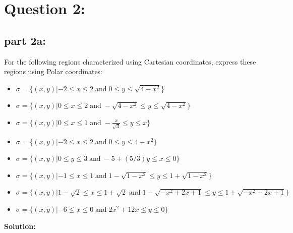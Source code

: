 \documentclass{article}
\newcommand{\dr}[1]{\textcolor{dark_red}{#1}}
\begin{document}
\section*{Question 2:}

\subsection*{part 2a:}

For the following regions characterized using Cartesian coordinates, express these regions using Polar coordinates:

\begin{itemize}
\item \(\sigma = \{(x,y) | -2 \leq x \leq 2 \;\text{and}\; 0 \leq y \leq \sqrt{4 - x^2}\}\)
\item \(\sigma = \{(x,y) | 0 \leq x \leq 2 \;\text{and}\; -\sqrt{4 - x^2} \leq y \leq \sqrt{4 - x^2}\}\)
\item \(\sigma = \{(x,y) | 0 \leq x \leq 1 \;\text{and}\; -\frac{x}{\sqrt{3}} \leq y \leq x\}\)
\item \(\sigma = \{(x,y) | -2 \leq x \leq 2 \;\text{and}\; 0 \leq y \leq 4 - x^2\}\)
\item \(\sigma = \{(x,y) | 0 \leq y \leq 3 \;\text{and}\; -5 + (5/3)y \leq x \leq 0\}\)
\item \(\sigma = \{(x,y) | -1 \leq x \leq 1 \;\text{and}\; 1 - \sqrt{1 - x^2} \leq y \leq 1 + \sqrt{1 - x^2}\}\)
\item \(\sigma = \{(x,y) | 1 - \sqrt{2} \leq x \leq 1 + \sqrt{2} \;\text{and}\; 1 - \sqrt{-x^2 + 2x + 1} \leq y \leq 1 + \sqrt{-x^2 + 2x + 1}\}\)
\item \(\sigma = \{(x,y) | -6 \leq x \leq 0 \;\text{and}\; 2x^2 + 12x \leq y \leq 0\}\)
\end{itemize}


\vspace{5mm}
\dr{\textbf{Solution:}}
\end{document}
